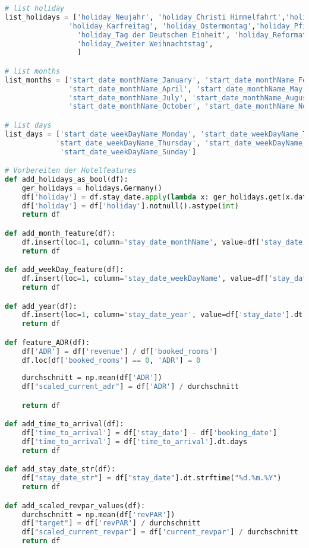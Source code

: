 \begin{lstlisting}[language=Python, label=lst:revpar_helper_funcs, caption=Hilfsfunktions für das RevPAR Modell]
# list holiday
list_holidays = ['holiday_Neujahr', 'holiday_Christi Himmelfahrt','holiday_Erster Mai',
               'holiday_Karfreitag', 'holiday_Ostermontag','holiday_Pfingstmontag',
                 'holiday_Tag der Deutschen Einheit', 'holiday_Reformationstag', 'holiday_Erster Weihnachtstag', 
                 'holiday_Zweiter Weihnachtstag', 
                 ]

# list months
list_months = ['start_date_monthName_January', 'start_date_monthName_February', 'start_date_monthName_March', 
               'start_date_monthName_April', 'start_date_monthName_May', 'start_date_monthName_June',
               'start_date_monthName_July', 'start_date_monthName_August', 'start_date_monthName_September', 
               'start_date_monthName_October', 'start_date_monthName_November', 'start_date_monthName_December' ]

# list days
list_days = ['start_date_weekDayName_Monday', 'start_date_weekDayName_Tuesday', 'start_date_weekDayName_Wednesday',
            'start_date_weekDayName_Thursday', 'start_date_weekDayName_Friday', 'start_date_weekDayName_Saturday', 
             'start_date_weekDayName_Sunday']

# Vorbereiten der Hotelfeatures
def add_holidays_as_bool(df):
    ger_holidays = holidays.Germany()
    df['holiday'] = df.stay_date.apply(lambda x: ger_holidays.get(x.date()))
    df['holiday'] = df['holiday'].notnull().astype(int)
    return df

def add_month_feature(df):
    df.insert(loc=1, column='stay_date_monthName', value=df['stay_date'].dt.month_name())  
    return df

def add_weekDay_feature(df):
    df.insert(loc=1, column='stay_date_weekDayName', value=df['stay_date'].dt.day_name())
    return df

def add_year(df):
    df.insert(loc=1, column='stay_date_year', value=df['stay_date'].dt.year)
    return df

def feature_ADR(df):
    df['ADR'] = df['revenue'] / df['booked_rooms']
    df.loc[df['booked_rooms'] == 0, 'ADR'] = 0
    
    durchschnitt = np.mean(df['ADR'])
    df["scaled_current_adr"] = df['ADR'] / durchschnitt

    return df

def add_time_to_arrival(df):
    df['time_to_arrival'] = df['stay_date'] - df['booking_date']
    df['time_to_arrival'] = df['time_to_arrival'].dt.days
    return df

def add_stay_date_str(df):
    df["stay_date_str"] = df["stay_date"].dt.strftime("%d.%m.%Y")
    return df

def add_scaled_revpar_values(df):
    durchschnitt = np.mean(df['revPAR'])
    df["target"] = df['revPAR'] / durchschnitt
    df["scaled_current_revpar"] = df['current_revpar'] / durchschnitt
    return df
\end{lstlisting}

